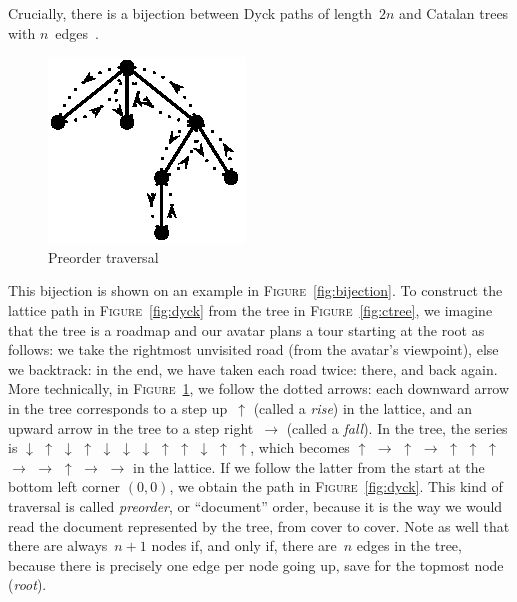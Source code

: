 \documentclass[11pt]{article}
\newcommand\fig{\textsc{Figure}}
\begin{document}
Crucially, there is a bijection between Dyck paths of length~\(2n\)
and Catalan trees with \(n\)~edges~\cite{Klarner}.

%
\begin{figure}
\centering
\includegraphics[scale=1.2]{preorder}
\caption{Preorder traversal \label{fig:preorder}}
\end{figure}
This bijection is shown on an example in \fig~\ref{fig:bijection}. To
construct the lattice path in \fig~\ref{fig:dyck} from the tree in
\fig~\ref{fig:ctree}, we imagine that the tree is a roadmap and our
avatar plans a tour starting at the root as follows: we take the
rightmost unvisited road (from the avatar's viewpoint), else we
backtrack: in the end, we have taken each road twice: there, and back
again. More technically, in \fig~\ref{fig:preorder}, we follow the
dotted arrows: each downward arrow in the tree corresponds to a step
up~\(\uparrow\) (called a \emph{rise}) in the lattice, and an upward
arrow in the tree to a step right~\(\rightarrow\) (called a
\emph{fall}). In the tree, the series is \(\downarrow\) \(\uparrow\)
\(\downarrow\) \(\uparrow\) \(\downarrow\) \(\downarrow\)
\(\downarrow\) \(\uparrow\) \(\uparrow\) \(\downarrow\) \(\uparrow\)
\(\uparrow\), which becomes \(\uparrow\) \(\rightarrow\) \(\uparrow\)
\(\rightarrow\) \(\uparrow\) \(\uparrow\) \(\uparrow\) \(\rightarrow\)
\(\rightarrow\) \(\uparrow\) \(\rightarrow\) \(\rightarrow\) in the
lattice. If we follow the latter from the start at the bottom left
corner \((0,0)\), we obtain the path in \fig~\ref{fig:dyck}. This kind
of traversal is called \emph{preorder}, or ``document'' order, because
it is the way we would read the document represented by the tree, from
cover to cover. Note as well that there are always~\(n+1\) nodes if,
and only if, there are~\(n\) edges in the tree, because there is
precisely one edge per node going up, save for the topmost node
(\emph{root}).
\end{document}
